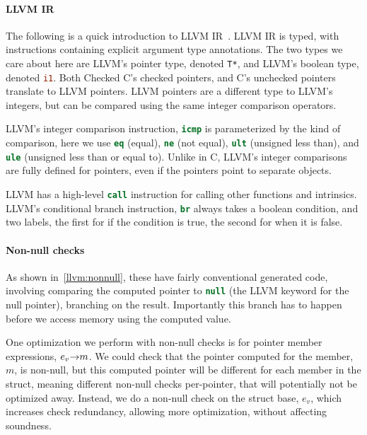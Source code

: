 \paragraph{LLVM IR} The following is a quick introduction to LLVM
IR~\cite{LLVMLangRef}. LLVM IR is typed, with instructions containing
explicit argument type annotations. The two types we care about here
are LLVM's pointer type, denoted \lstinline[language=LLVM]|T*|, and
LLVM's boolean type, denoted \lstinline[language=LLVM]|i1|. Both
Checked C's checked pointers, and C's unchecked pointers translate to
LLVM pointers. LLVM pointers are a different type to LLVM's integers,
but can be compared using the same integer comparison operators.

LLVM's integer comparison instruction, \lstinline[language=LLVM]|icmp|
is parameterized by the kind of comparison, here we use
\lstinline[language=LLVM]|eq| (equal), \lstinline[language=LLVM]|ne|
(not equal), \lstinline[language=LLVM]|ult| (unsigned less than), and
\lstinline[language=LLVM]|ule| (unsigned less than or equal to).
Unlike in C, LLVM's integer comparisons are fully defined for
pointers, even if the pointers point to separate objects.

LLVM has a high-level \lstinline[language=LLVM]|call| instruction for
calling other functions and intrinsics. LLVM's conditional branch
instruction, \lstinline[language=LLVM]|br| always takes a boolean
condition, and two labels, the first for if the condition is true, the
second for when it is false.

\paragraph{Non-null checks} As shown in~\autoref{llvm:nonnull}, these
have fairly conventional generated code, involving comparing the
computed pointer to \lstinline[language=LLVM]|null| (the LLVM keyword
for the null pointer), branching on the result. Importantly this
branch has to happen before we access memory using the computed value.

One optimization we perform with non-null checks is for pointer member
expressions, $e_v \mathord{\rightarrow} m$. We could check that the pointer computed
for the member, $m$, is non-null, but this computed pointer will be
different for each member in the struct, meaning different non-null
checks per-pointer, that will potentially not be optimized away.
Instead, we do a non-null check on the struct base, $e_v$, which
increases check redundancy, allowing more optimization, without
affecting soundness.

